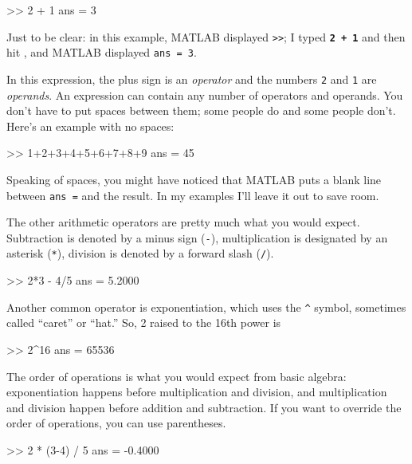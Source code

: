 \begin{code}
>> 2 + 1
ans = 3
\end{code}

Just to be clear: in this example, MATLAB displayed \lstinline{>>}; I
typed \textbf{\lstinline{2 + 1}} and then hit , and MATLAB displayed \lstinline{ans = 3}.


In this expression, the plus sign is an \emph{operator} and the numbers \lstinline{2} and \lstinline{1} are \emph{operands}.
An expression can contain any number of operators and operands.  You
don't have to put spaces between them; some people do and some people
don't. Here's an example with no spaces:

\begin{code}
>> 1+2+3+4+5+6+7+8+9
ans = 45
\end{code}

Speaking of spaces, you might have noticed that MATLAB puts a blank
line between \lstinline{ans =} and the result.  In my examples I'll leave it out to  save room.


The other arithmetic operators are pretty much what you would expect.
Subtraction is denoted by a minus sign (\lstinline{-}), multiplication is designated by
an asterisk (\lstinline{*}), division is denoted by a forward slash (\lstinline{/}).

\begin{code}
>> 2*3 - 4/5
ans = 5.2000
\end{code}

Another common operator is exponentiation, which uses the \lstinline{^}
symbol, sometimes called ``caret'' or ``hat.''  So, 2 raised to the
16th power is

\begin{code}
>> 2^16
ans = 65536
\end{code}

The order of operations is what you would expect from basic algebra:
exponentiation happens before multiplication and division, and multiplication and division happen before addition and subtraction.
If you want to override the order of operations, you can use parentheses.


\begin{code}
>> 2 * (3-4) / 5
ans = -0.4000
\end{code}

